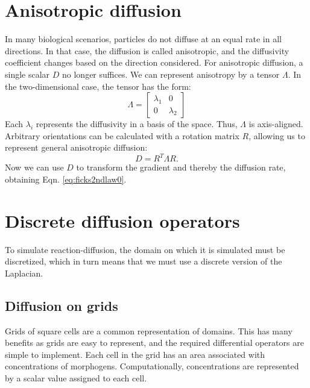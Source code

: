 \section{Anisotropic diffusion}
In many biological scenarios, particles do not diffuse at an equal rate in all directions. In that case, the diffusion is called anisotropic, and the diffusivity coefficient changes based on the direction considered. For anisotropic diffusion, a single scalar $D$ no longer suffices. We can represent anisotropy by a tensor $\Lambda$. In the two-dimensional case, the tensor has the form:
\begin{equation}
\label{eq:diffTensor}
\Lambda =
\begin{bmatrix}
    \lambda_1 & 0 \\
    0 & \lambda_2 
\end{bmatrix}
\end{equation}
Each $\lambda_i$ represents the diffusivity in a basis of the space. Thus, $\Lambda$ is axis-aligned. Arbitrary orientations can be calculated with a rotation matrix $R$, allowing us to represent general anisotropic diffusion:
\begin{equation}
\label{eq:anisoDiffTensor}
	D = R^T \Lambda R.
\end{equation}
Now we can use $D$ to transform the gradient and thereby the diffusion rate, obtaining Eqn. \ref{eq:ficks2ndlaw0}.

\section{Discrete diffusion operators}
To simulate reaction-diffusion, the domain on which it is simulated must be discretized, which in turn means that we must use a discrete version of the Laplacian.

\subsection{Diffusion on grids}
Grids of square cells are a common representation of domains. This has many benefits as grids are easy to represent, and the required differential operators are simple to implement. Each cell in the grid has an area associated with concentrations of morphogens. Computationally, concentrations are represented by a scalar value assigned to each cell.

